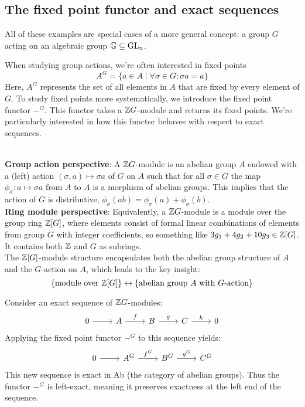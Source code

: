 \subsection{The fixed point functor and exact sequences}

\begin{outline}
\0 All of these examples are special cases of a more general concept: a group $G$ acting on an algebraic group $\mathbb{G} \subseteq \operatorname{GL}_n$.

When studying group actions, we're often interested in fixed points 
$$A^G =\{a\in A \mid \forall \sigma \in G: \sigma a = a \}$$ 
Here, $A^G$ represents the set of all elements in $A$ that are fixed by every element of $G$. To study fixed points more systematically, we introduce the fixed point functor $-^G$. This functor takes a $\mathbb{Z} G$-module  and returns its fixed points. We're particularly interested in how this functor behaves with respect to exact sequences.

\begin{note}
~\\
\textbf{Group action perspective}: A $\mathbb{Z} G$-module is an abelian group $A$ endowed with a (left) action $(\sigma, a) \mapsto \sigma a$ of $G$ on $A$ such that for all $\sigma\in G$ the map $\phi_\sigma : a \mapsto \sigma a$ from $A$ to $A$ is a morphism of abelian groups. This implies that the action of $G$ is distributive, $\phi_\sigma (ab) = \phi_\sigma (a) + \phi_\sigma (b)$.\\
\textbf{Ring module perspective}: Equivalently, a $\mathbb{Z} G$-module is a module over the group ring $\mathbb{Z}[G]$, where elements consist of formal linear combinations of elements from group $G$ with integer coefficients, so something like $3g_1+4g_2+10g_3 \in \mathbb{Z}[G]$. It contains both $\mathbb{Z}$ and $G$ as subrings.\\
The $\mathbb{Z}[G]$-module structure encapsulates both the abelian group structure of $A$ and the $G$-action on $A$, which leads to the key insight:
$$\{\text{module over } \mathbb{Z}[G]\} \leftrightarrow \{\text{abelian group $A$ with $G$-action}\}$$
\end{note}

\begin{lemma}
    Consider an exact sequence of $\mathbb{Z} G$-modules:
    $$\begin{tikzcd}
    0\arrow[r] & A \arrow[r, "f"] & B\arrow[r, "g"] & C\arrow[r, "h"] & 0
    \end{tikzcd}$$
    Applying the fixed point functor $-^G$ to this sequence yields:
    $$\begin{tikzcd}
    0\arrow[r] & A^G \arrow[r, "f^G"] & B^G \arrow[r, "g^G"] & C^G
    \end{tikzcd}$$
    This new sequence is exact in Ab (the category of abelian groups). Thus the functor $-^G$ is left-exact, meaning it preserves exactness at the left end of the sequence.
\end{lemma}


\end{outline}
